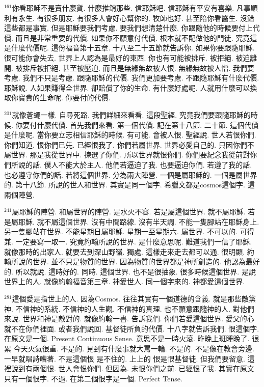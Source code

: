 \documentclass{book}
\begin{document}
$^{161}$你看耶穌不是賣什麼貨.
什麼推銷那些.
信耶穌吧.
信耶穌有平安有喜樂.
凡事順利有永生.
有很多朋友.
有很多人會好心幫你的.
牧師也好.
甚至陪你看醫生.
沒錯這些都是事實.
但是耶穌要我們考慮.
要我們想清楚什麼.
你跟隨他的時候要付上代價.
而且是非常重要的代價.
如果你不願意付代價.
根本就不配做他的門徒.
究竟這是什麼代價呢.
這份福音第十五章.
十八至二十五節就告訴你.
如果你要跟隨耶穌.
很可能你會失去.
世界上人認為是最好的東西.
你也有可能被排斥.
被拒絕.
被迫離開.
被排斥被拒絕.
甚至被壓迫.
而且是無緣無故被人恨.
無緣無故被人憎.
我們要考慮.
我們不只是考慮.
跟隨耶穌的代價.
我們更加要考慮.
不跟隨耶穌有什麼代價.
耶穌說.
人如果賺得全世界.
卻賠償了你的生命.
有什麼好處呢.
人就用什麼可以換取你寶貴的生命呢.
你要付的代價.

$^{201}$就像蒼蠅一樣.
自尋死路.
我們詳細來看看.
這段聖經.
究竟我們要跟隨耶穌的時候.
你要付什麼代價.
首先我們來看.
第一個代價.
記在第十八節.
二十節.
這個代價是什麼呢.
當你要立志相信耶穌的時候.
有可能.
會被人恨.
聖經說.
世人若恨你們.
你們知道.
恨你們已先.
已經恨我了.
你們若屬世界.
世界必愛自己的.
只因你們不屬世界.
那是我從世界中.
揀選了你們.
所以世界就恨你們.
你們要紀念我從前對你們所說的話.
僕人不能大於主人.
他們若逼迫了我.
也要逼迫你們.
若遵了我的話.
也必遵守你們的話.
若將這個世界.
分為兩大陣營.
一個是屬耶穌的.
一個是屬世界的.
第十八節.
所說的世人和世界.
其實是同一個字.
希臘文都是cosmos這個字.
這兩個陣營.

$^{241}$屬耶穌的陣營.
和屬世界的陣營.
是水火不容.
若是屬這個世界.
就不屬耶穌.
若是屬耶穌.
就不屬這個世界.
沒有中間路線.
沒有半天調.
不能一隻腳站在耶穌身上.
另一隻腳站在世界.
不能星期日屬耶穌.
星期一至星期六.
屬世界.
不可以的.
可得兼.
一定要寫一取一.
究竟約翰所說的世界.
是什麼意思呢.
難道我們一信了耶穌.
就像那時的出家人.
就要去到深山野嶺.
獨處.
這樣走來走去都可以通.
很明顯.
約翰所說的世界.
並不只是物質的世界.
因為物質的世界都是神所創造的.
他認為最好的.
所以就說.
這時好的.
同時.
這個世界.
也不是很抽象.
很多時候這個世界.
是說世界上的人.
就像約翰福音第三章.
神愛世人.
同一個字來的.
神都愛這個世界.

$^{281}$這個愛是指世上的人.
因為Cosmos.
往往其實有一個道德的含義.
就是那些敵黨神.
不信神的系統.
不信神的人生觀.
不信神的真理.
也不願意跟隨神的人.
對他們來說.
世界和神是敵對的.
就像約翰一書.
告訴我們.
你們若愛這個世界.
愛父的心就不在你們裡面.
或者我們說回.
基督徒所負的代價.
十八字就告訴我們.
恨這個字.
在原文是一個.
Present Continuous Sense.
意思不是一時火滾.
昨晚上班睡晚了.
很累 今天火氣很重.
不是的.
見到有什麼事就大罵一輪.
不是的.
不是像在教會旁邊.
一早就唱詩嘈著.
不是這個恨 是不住的.
上上的 恨是恨基督徒.
但我們要留意.
這裡說到有兩個恨.
世人會恨你們.
但因為.
未恨你們之前.
已經恨了我.
其實在原文只有一個恨字.
不過.
在第二個恨字是一個.
Perfect Tense.
\end{document}
